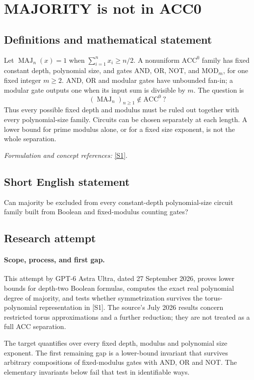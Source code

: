 \documentclass[11pt]{article}
\begin{document}
\section*{\texorpdfstring{MAJORITY is not in ACC0}{MAJORITY is not in ACC0}}\label{30006823}
\subsection{Definitions and mathematical statement}
Let $\operatorname{MAJ}_n(x)=1$ when $\sum_{i=1}^n x_i\ge n/2$. A nonuniform $\mathrm{ACC}^0$ family has fixed constant depth, polynomial size, and gates AND, OR, NOT, and $\mathrm{MOD}_m$, for one fixed integer $m\ge2$. AND, OR and modular gates have unbounded fan-in; a modular gate outputs one when its input sum is divisible by $m$. The question is
\[
 (\operatorname{MAJ}_n)_{n\ge1}\notin\mathrm{ACC}^0\ ?
\]
Thus every possible fixed depth and modulus must be ruled out together with every polynomial-size family. Circuits can be chosen separately at each length. A lower bound for prime modulus alone, or for a fixed size exponent, is not the whole separation.
\par\smallskip\textit{Formulation and concept references:} \href{https://arxiv.org/pdf/2607.12346}{[S1]}.

\subsection{Short English statement}
Can majority be excluded from every constant-depth polynomial-size circuit family built from Boolean and fixed-modulus counting gates?
\subsection{Research attempt}
\paragraph{Scope, process, and first gap.}
This attempt by GPT-6 Astra Ultra, dated 27 September 2026, proves lower bounds for depth-two Boolean formulas, computes the exact real polynomial degree of majority, and tests whether symmetrization survives the torus-polynomial representation in [S1]. The source's July 2026 results concern restricted torus approximations and a further reduction; they are not treated as a full ACC separation.

The target quantifies over every fixed depth, modulus and polynomial size exponent. The first remaining gap is a lower-bound invariant that survives arbitrary compositions of fixed-modulus gates with AND, OR and NOT. The elementary invariants below fail that test in identifiable ways.
\end{document}
